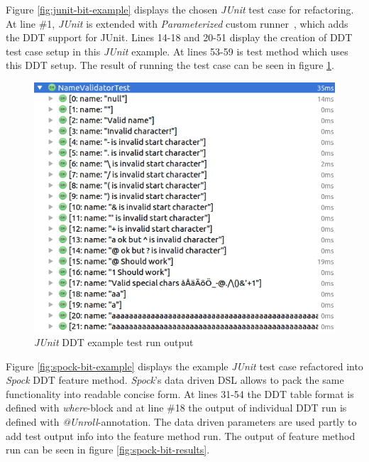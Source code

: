     \restoregeometry

    Figure \ref{fig:junit-bit-example} displays the chosen \textit{JUnit} test case for refactoring. At line \#1, \textit{JUnit} is extended with
    \textit{Parameterized} custom runner~\cite{junit-parameterized}, which adds the DDT support for JUnit.
    Lines 14-18 and 20-51 display the creation
    of DDT test case setup in this \textit{JUnit} example. At lines 53-59 is test method which uses this DDT setup. The result of running
    the test case can be seen in figure \ref{fig:junit-bit-results}.

    \begin{figure}[H]
      \begin{center}
        \begin{topbot}[style=mdstyle]
        \includegraphics[width=\textwidth]{images/junit-validator-results.png}
        \end{topbot}
        \caption{\textit{JUnit} DDT example test run output}
        \label{fig:junit-bit-results}
      \end{center}
    \end{figure}

    Figure \ref{fig:spock-bit-example} displays the example \textit{JUnit} test case refactored into \textit{Spock} DDT feature method. \textit{Spock}'s
    data driven DSL allows to pack the same functionality into readable concise form.  At lines 31-54 the DDT table format
    is defined with \textit{where}-block and at line \#18 the output of individual DDT run is defined with \textit{@Unroll}-annotation.
    The data driven parameters are used partly
    to add test output info into the feature method run. The output of feature method run can
    be seen in figure \ref{fig:spock-bit-results}.

